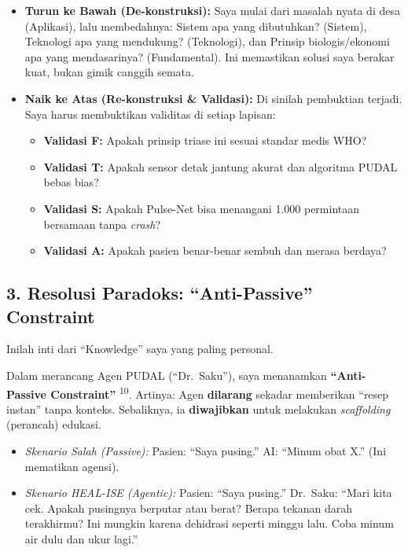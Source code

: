 \documentclass[
  letterpaper,
  DIV=11,
  numbers=noendperiod]{scrreprt}
\providecommand{\tightlist}{%
  \setlength{\itemsep}{0pt}\setlength{\parskip}{0pt}}
\begin{document}
\begin{itemize}
\item
  \textbf{Turun ke Bawah (De-konstruksi):} Saya mulai dari masalah nyata
  di desa (Aplikasi), lalu membedahnya: Sistem apa yang dibutuhkan?
  (Sistem), Teknologi apa yang mendukung? (Teknologi), dan Prinsip
  biologis/ekonomi apa yang mendasarinya? (Fundamental). Ini memastikan
  solusi saya berakar kuat, bukan gimik canggih semata.
\item
  \textbf{Naik ke Atas (Re-konstruksi \& Validasi):} Di sinilah
  pembuktian terjadi. Saya harus membuktikan validitas di setiap
  lapisan:

  \begin{itemize}
  \tightlist
  \item
    \textbf{Validasi F:} Apakah prinsip triase ini sesuai standar medis
    WHO?
  \item
    \textbf{Validasi T:} Apakah sensor detak jantung akurat dan
    algoritma PUDAL bebas bias?
  \item
    \textbf{Validasi S:} Apakah Pulse-Net bisa menangani 1.000
    permintaan bersamaan tanpa \emph{crash}?
  \item
    \textbf{Validasi A:} Apakah pasien benar-benar sembuh dan merasa
    berdaya?
  \end{itemize}
\end{itemize}

\subsection{3. Resolusi Paradoks: ``Anti-Passive''
Constraint}\label{resolusi-paradoks-anti-passive-constraint}

Inilah inti dari ``Knowledge'' saya yang paling personal.

Dalam merancang Agen PUDAL (``Dr.~Saku''), saya menanamkan
\textbf{``Anti-Passive Constraint''} \textsuperscript{10}. Artinya: Agen
\textbf{dilarang} sekadar memberikan ``resep instan'' tanpa konteks.
Sebaliknya, ia \textbf{diwajibkan} untuk melakukan \emph{scaffolding}
(perancah) edukasi.

\begin{itemize}
\item
  \emph{Skenario Salah (Passive):} Pasien: ``Saya pusing.'' AI: ``Minum
  obat X.'' (Ini mematikan agensi).
\item
  \emph{Skenario HEAL-ISE (Agentic):} Pasien: ``Saya pusing.'' Dr.~Saku:
  ``Mari kita cek. Apakah pusingnya berputar atau berat? Berapa tekanan
  darah terakhirmu? Ini mungkin karena dehidrasi seperti minggu lalu.
  Coba minum air dulu dan ukur lagi.''
\end{itemize}
\end{document}
